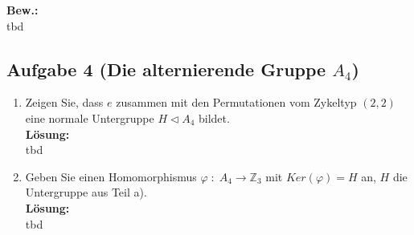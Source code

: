 \documentclass[11pt,a4paper,ngerman]{article}
\begin{document}
\textbf{Bew.:}\\

tbd


\subsection*{Aufgabe 4 \mdseries (Die alternierende Gruppe $A_4$)}

\begin{enumerate}[\bfseries a)]
\item Zeigen Sie, dass $e$ zusammen mit den Permutationen vom Zykeltyp $(2,2)$ eine normale Untergruppe $H \vartriangleleft A_4$ bildet.\\

\textbf{Lösung:}\\

tbd


\item Geben Sie einen Homomorphismus $\varphi \; : \; A_4 \rightarrow \mathbb{Z}_3$ mit $Ker(\varphi ) = H$ an, $H$ die Untergruppe aus Teil a).\\

\textbf{Lösung:}\\

tbd

\end{enumerate}

\label{LastPage}
\end{document}
